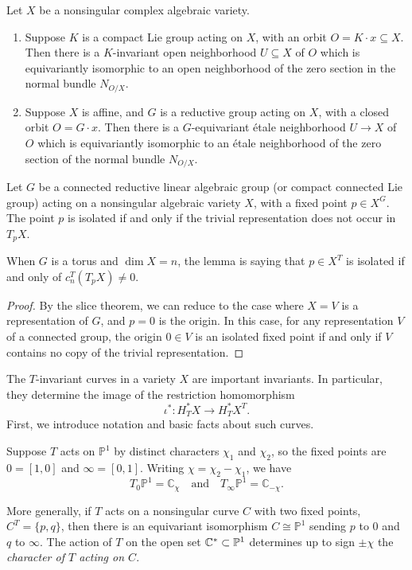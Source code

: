 \begin{theorem}
	\label{thm:slice}
	Let $X$ be a nonsingular complex algebraic variety.
	\begin{enumerate}
		\item Suppose $K$ is a compact Lie group acting on $X$, with an orbit $O = K \cdot x \subseteq X$. Then there is a $K$-invariant open neighborhood $U \subseteq X$ of $O$ which is equivariantly isomorphic to an open neighborhood of the zero section in the normal bundle $N_{O/X}$.

		\item Suppose $X$ is affine, and $G$ is a reductive group acting on $X$, with a closed orbit $O = G \cdot x$. Then there is a $G$-equivariant étale neighborhood $U \to X$ of $O$ which is equivariantly isomorphic to an étale neighborhood of the zero section of the normal bundle $N_{O/X}$.
	\end{enumerate}
\end{theorem}
\begin{lemma}
	Let $G$ be a connected reductive linear algebraic group (or compact connected Lie group) acting on a nonsingular algebraic variety $X$, with a fixed point $p \in X^G$. The point $p$ is isolated if and only if the trivial representation does not occur in $T_p X$.
\end{lemma}
When $G$ is a torus and $\dim X = n$, the lemma is saying that $p\in X^T$ is isolated if and only of $c_n^T(T_pX) \neq 0$.
\begin{proof}
	By the slice theorem, we can reduce to the case where $X = V$ is a representation of $G$, and $p = 0$ is the origin. In this case, for any representation $V$ of a connected group, the origin $0 \in V$ is an isolated fixed point if and only if $V$ contains no copy of the trivial representation.
\end{proof}

The \( T \)-invariant curves in a variety \( X \) are important invariants. In particular, they determine the image of the restriction homomorphism
\[
	\iota^* : H_T^*X \to H_T^*X^T.
\]
First, we introduce notation and basic facts about such curves.

Suppose \( T \) acts on \( \mathbb{P}^1 \) by distinct characters \( \chi_1 \) and \( \chi_2 \), so the fixed points are \( 0 = [1, 0] \) and \( \infty = [0, 1] \). Writing \( \chi = \chi_2 - \chi_1 \), we have
\[
	T_0\mathbb{P}^1 = \mathbb{C}_\chi \quad \text{and} \quad T_\infty\mathbb{P}^1 = \mathbb{C}_{-\chi}.
\]

More generally, if \( T \) acts on a nonsingular curve \( C \) with two fixed points, \( C^T = \{p, q\} \), then there is an equivariant isomorphism \( C \cong \mathbb{P}^1 \) sending \( p \) to \( 0 \) and \( q \) to \( \infty \). The action of $T$ on the open set $\mathbb{C}^*\subset\mathbb{P}^1$ determines up to sign \( \pm\chi \) the \emph{character of \( T \) acting on \( C \)}.

